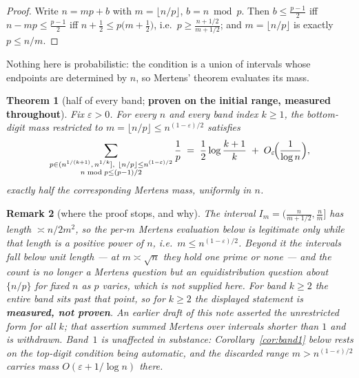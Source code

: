 \documentclass[11pt]{article}
\newtheorem{theorem}{Theorem}
\newtheorem{remark}[theorem]{Remark}
\begin{document}
\begin{proof}
Write $n=mp+b$ with $m=\lfloor n/p\rfloor$, $b=n\bmod p$.  Then
$b\le\frac{p-1}2$ iff $n-mp\le\frac{p-1}{2}$ iff
$n+\frac12\le p\bigl(m+\frac12\bigr)$, i.e.\ $p\ge\frac{n+1/2}{m+1/2}$;
and $m=\lfloor n/p\rfloor$ is exactly $p\le n/m$.
\end{proof}

Nothing here is probabilistic: the condition is a union of intervals whose
endpoints are determined by $n$, so Mertens' theorem evaluates its mass.

\begin{theorem}[half of every band; \textbf{proven on the initial range,
measured throughout}]\label{thm:half}
Fix $\varepsilon>0$.  For every $n$ and every band index $k\ge1$, the
bottom-digit mass restricted to $m=\lfloor n/p\rfloor\le n^{(1-\varepsilon)/2}$
satisfies
\[
  \sum_{\substack{p\in(n^{1/(k+1)},\,n^{1/k}],\ \lfloor n/p\rfloor\le n^{(1-\varepsilon)/2}\\ n\bmod p\le(p-1)/2}}\frac1p
  \;=\;\frac12\log\frac{k+1}{k}\;+\;O_\varepsilon\!\Bigl(\frac1{\log n}\Bigr),
\]
exactly half the corresponding Mertens mass, uniformly in $n$.
\end{theorem}

\begin{remark}[where the proof stops, and why]\label{rem:stops}
The interval $I_m=\bigl(\frac{n}{m+1/2},\frac nm\bigr]$ has length
$\asymp n/2m^2$, so the per-$m$ Mertens evaluation below is legitimate only
while that length is a positive power of $n$, i.e.\ $m\le n^{(1-\varepsilon)/2}$.
Beyond it the intervals fall below unit length --- at $m\asymp\sqrt n$ they hold
one prime or none --- and the count is no longer a Mertens question but an
equidistribution question about $\{n/p\}$ for \emph{fixed} $n$ as $p$ varies,
which is not supplied here.  For band $k\ge2$ the entire band sits past that
point, so for $k\ge2$ the displayed statement is \textbf{measured, not proven}.
An earlier draft of this note asserted the unrestricted form for all $k$; that
assertion summed Mertens over intervals shorter than $1$ and is withdrawn.
Band~$1$ is unaffected in substance: Corollary~\ref{cor:band1} below rests on
the top-digit condition being automatic, and the discarded range
$m>n^{(1-\varepsilon)/2}$ carries mass $O(\varepsilon+1/\log n)$ there.
\end{remark}
\end{document}
